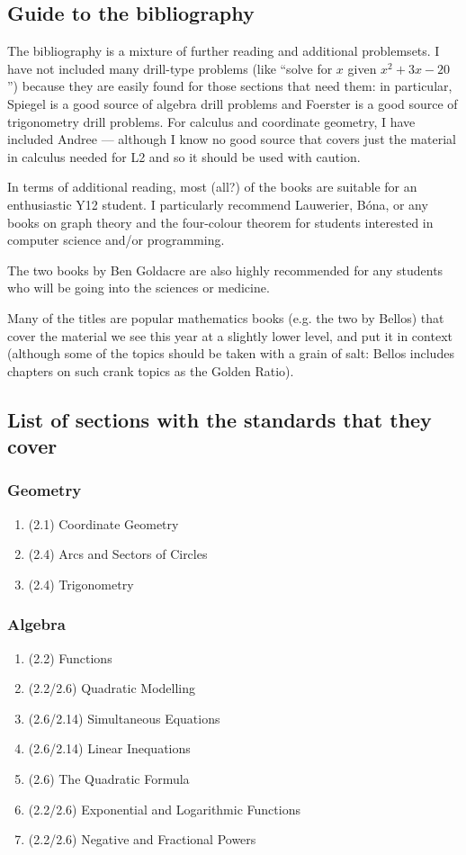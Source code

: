\subsection*{Guide to the bibliography}
The bibliography is a mixture of further reading and additional problemsets. I have not included many drill-type problems
(like ``solve for $ x $ given $ x^2 + 3x - 20 $'') because they are easily found for those sections that need them: in particular,
Spiegel is a good source of algebra drill problems and Foerster is a good source of trigonometry drill problems. For calculus
and coordinate geometry, I have included Andree --- although I know no good source that covers just the material in calculus needed
for L2 and so it should be used with caution.

In terms of additional reading, most (all?) of the books are suitable for an enthusiastic Y12 student. I particularly recommend
Lauwerier, B\'ona, or any books on graph theory and the four-colour theorem for students interested in computer science and/or programming.

The two books by Ben Goldacre are also highly recommended for any students who will be going into the sciences or medicine.

Many of the titles are popular mathematics books (e.g. the two by Bellos) that cover the material we see this year at a slightly lower
level, and put it in context (although some of the topics should be taken with a grain of salt: Bellos includes chapters on such crank
topics as the Golden Ratio).

\subsection*{List of sections with the standards that they cover}
\subsubsection*{Geometry}
\begin{enumerate}
  \item (2.1) Coordinate Geometry
  \item (2.4) Arcs and Sectors of Circles
  \item (2.4) Trigonometry
\end{enumerate}

\subsubsection*{Algebra}
\begin{enumerate}[resume]
  \item (2.2) Functions
  \item (2.2/2.6) Quadratic Modelling
  \item (2.6/2.14) Simultaneous Equations
  \item (2.6/2.14) Linear Inequations
  \item (2.6) The Quadratic Formula
  \item (2.2/2.6) Exponential and Logarithmic Functions
  \item (2.2/2.6) Negative and Fractional Powers
\end{enumerate}

